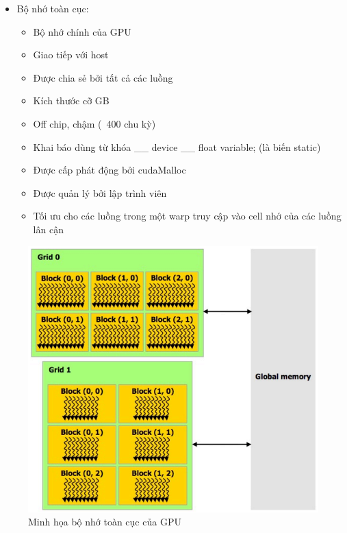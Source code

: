 \documentclass[14pt, a4paper]{article}
\numberwithin{equation}{section}
\numberwithin{figure}{section}
\numberwithin{dl}{section}
\numberwithin{md}{section}
\numberwithin{bd}{section}
\numberwithin{dn}{section}
\numberwithin{hq}{section}
\begin{document}
\begin{itemize}
    \item Bộ nhớ toàn cục:
    \begin{itemize}
        \item Bộ nhớ chính của GPU
        \item Giao tiếp với host
        \item Được chia sẻ bởi tất cả các luồng 
        \item Kích thước cỡ GB 
        \item Off chip, chậm (~400 chu kỳ)
        \item Khai báo dùng từ khóa \_\_ device \_\_ float variable; (là biến static)
        \item Được cấp phát động bởi cudaMalloc
        \item Được quản lý bởi lập trình viên
        \item Tối ưu cho các luồng trong một warp truy cập vào cell nhớ của các luồng lân cận
    \end{itemize}
\end{itemize}

\begin{figure}[H]
    \centering
    \includegraphics[width=\linewidth]{figures/CUDA/GPU_Global_Memory.png}
    \caption{Minh họa bộ nhớ toàn cục của GPU}
\end{figure}
\end{document}
